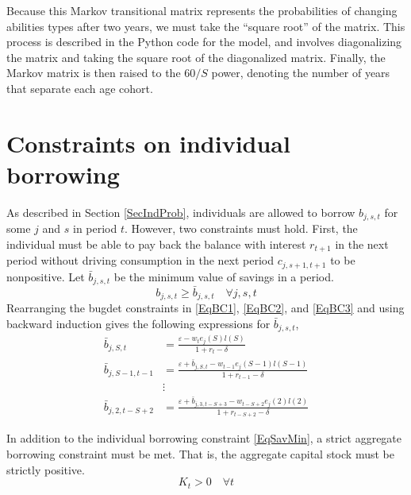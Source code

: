 \documentclass[letterpaper,12pt]{article}
\theoremstyle{definition}
\newcommand\ve{\varepsilon}
\begin{document}
  Because this Markov transitional matrix represents the probabilities of changing abilities types after two years, we must take the ``square root'' of the matrix.  This process is described in the Python code for the model, and involves diagonalizing the matrix and taking the square root of the diagonalized matrix.  Finally, the Markov matrix is then raised to the $60/S$ power, denoting the number of years that separate each age cohort.



\newpage
\section{Constraints on individual borrowing}\label{AppBorConstr}

  As described in Section \ref{SecIndProb}, individuals are allowed to borrow $b_{j,s,t}$ for some $j$ and $s$ in period $t$. However, two constraints must hold. First, the individual must be able to pay back the balance with interest $r_{t+1}$ in the next period without driving consumption in the next period $c_{j,s+1,t+1}$ to be nonpositive. Let $\bar{b}_{j,s,t}$ be the minimum value of savings in a period.
  \begin{equation}\label{EqSavMin}
    b_{j,s,t}\geq\bar{b}_{j,s,t} \quad\forall j,s,t
  \end{equation}
  Rearranging the bugdet constraints in \eqref{EqBC1}, \eqref{EqBC2}, and \eqref{EqBC3} and using backward induction gives the following expressions for $\bar{b}_{j,s,t}$,
  \begin{equation}\label{EqBorConsts}
    \begin{split}
      \bar{b}_{j,S,t} &= \frac{\ve - w_te_j(S)l(S)}{1+r_t-\delta}  \\
      \bar{b}_{j,S-1,t-1} &= \frac{\ve + \bar{b}_{j,S,t} - w_{t-1}e_j(S-1)l(S-1)}{1+r_{t-1}-\delta} \\
      &\vdots \\
      \bar{b}_{j,2,t-S+2} &= \frac{\ve + \bar{b}_{j,3,t-S+3} - w_{t-S+2}e_j(2)l(2)}{1+r_{t-S+2}-\delta}
    \end{split}
  \end{equation}

  In addition to the individual borrowing constraint \eqref{EqSavMin}, a strict aggregate borrowing constraint must be met. That is, the aggregate capital stock must be strictly positive.
  \begin{equation}\label{EqAggrCapConstr}
    K_t > 0 \quad\forall t
  \end{equation}
\end{document}
